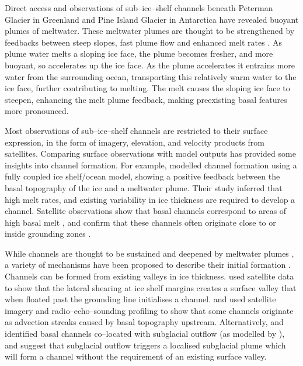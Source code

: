 % 
Direct access and observations of sub--ice--shelf channels beneath Peterman Glacier in Greenland \citep{rignot2008channelized} and Pine Island Glacier in Antarctica \citep{stanton2013channelized} have revealed buoyant plumes of meltwater. 
These meltwater plumes are thought to be strengthened by feedbacks between steep slopes, fast plume flow and enhanced melt rates \cite [e.g.][] {jenkins2011convection, sergienko2013basal, gladish2012ice}. As plume water melts a sloping ice face, the plume becomes fresher, and more buoyant, so accelerates up the ice face. As the plume accelerates it entrains more water from the surrounding ocean, transporting this relatively warm water to the ice face, further contributing to melting. The melt causes the sloping ice face to steepen,  enhancing the melt plume feedback, making preexisting basal features more pronounced. 

Most observations of sub--ice--shelf channels are restricted to their surface expression, in the form of imagery, elevation, and velocity products from satellites. Comparing surface observations with model outputs has provided some insights into channel formation. 
For example, \cite{sergienko2013basal} modelled channel formation using a fully coupled ice shelf/ocean model, showing a positive feedback between the basal topography of the ice and a meltwater plume. Their study inferred that high melt rates, and existing variability in ice thickness are required to develop a channel. Satellite observations show that basal channels correspond to areas of high basal melt \cite [e.g.][]{rignot2008recent}, and confirm that these channels often originate close to or inside grounding zones \citep{alley2016impacts}.

While channels are thought to be sustained and deepened by meltwater plumes \cite [e.g.][] {sergienko2013basal}, a variety of mechanisms have been proposed to describe their initial formation  \cite [e.g.][] {alley2019troughs}. 
Channels can be formed from existing valleys in ice thickness. \cite{alley2019troughs} used satellite data to show that the lateral shearing at ice shelf margins creates a surface valley that when floated past the grounding line initialises a channel. \cite{drews2017actively} and \cite{jeofry2018hard} used satellite imagery and radio--echo--sounding profiling to show that some channels originate as advection streaks caused by basal topography upstream. 
Alternatively, \cite{alley2016impacts} and \cite{le2013evidence} identified basal channels co--located with subglacial outflow (as modelled by \cite{le2013evidence}), and suggest that subglacial outflow triggers a localised subglacial plume which will form a channel without the requirement of an existing surface valley. 

